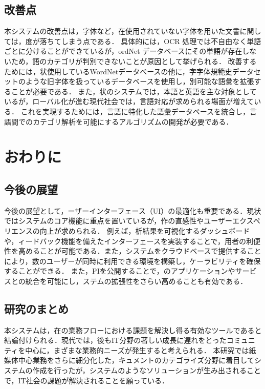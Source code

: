 \documentclass[a4j, 10pt, twocolumn]{ujarticle}
\begin{document}
\subsection{改善点}

本システムの改善点は，字体など，在使用されていない字体を用いた文書に関しては，度が落ちてしまう点である．
具体的には，OCR 処理では不自由なく単語ごとに分けることができているが，ordNet データベースにその単語が存在しないため，語のカテゴリが判別できないことが原因として挙げられる．
改善するためには，状使用しているWordNetデータべースの他に，字字体規範史データセットのような旧字体を扱っているデータベースを使用し，別可能な語彙を拡張することが必要である．
また，状のシステムでは，本語と英語を主な対象としているが，ローバル化が進む現代社会では，言語対応が求められる場面が増えている．
これを実現するためには，言語に特化した語彙データベースを統合し，言語間でのカテゴリ解析を可能にするアルゴリズムの開発が必要である．

\section{おわりに}
\subsection{今後の展望}

今後の展望として，ーザーインターフェース（UI）の最適化も重要である．現状ではシステムのコア機能に重点を置いているが，作の直感性やユーザーエクスペリエンスの向上が求められる．
例えば，析結果を可視化するダッシュボードや，ィードバック機能を備えたインターフェースを実装することで，用者の利便性を高めることが可能である．また，システムをクラウドベースで提供することにより，数のユーザーが同時に利用できる環境を構築し，ケーラビリティを確保することができる．
また，PIを公開することで，のアプリケーションやサービスとの統合を可能にし，ステムの拡張性をさらい高めることも有効である．

\subsection{研究のまとめ}

本システムは，在の業務フローにおける課題を解決し得る有効なツールであると結論付けられる．現代では，後もIT分野の著しい成長に遅れをとったコミュニティを中心に，まざまな業務的ニーズが発生すると考えられる．
本研究では紙媒体中心業務をさらに細分化した，キュメントのカテゴライズ分野に着目してシステムの作成を行ったが，システムのようなソリューションが生み出されることで，IT社会の課題が解決されることを願っている．



\end{document}
